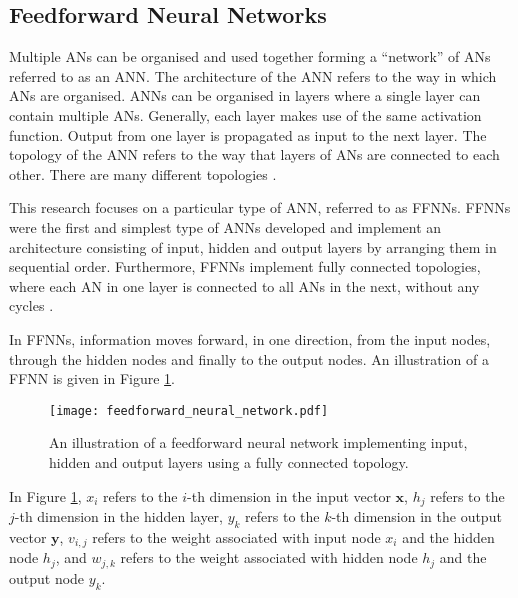 \subsection{Feedforward Neural Networks}
\label{sec:anns:ffnn}

Multiple \acp{AN} can be organised and used together forming a ``network'' of \acp{AN} referred to as an \acf{ANN}. The architecture of the \acs{ANN} refers to the way in which \acp{AN} are organised. \acp{ANN} can be organised in layers where a single layer can contain multiple \acp{AN}. Generally, each layer makes use of the same activation function. Output from one layer is propagated as input to the next layer. The topology of the \acs{ANN} refers to the way that layers of \acp{AN} are connected to each other. There are many different topologies  \cite{ref:miikkulainen:2010}.

This research focuses on a particular type of \acs{ANN}, referred to as \acp{FFNN}. \acp{FFNN} were the first and simplest type of \acp{ANN} developed  \cite{ref:schmidhuber:2015} and implement an architecture consisting of input, hidden and output layers by arranging them in sequential order. Furthermore, \acp{FFNN} implement fully connected topologies, where each \acs{AN} in one layer is connected to all \acp{AN} in the next, without any cycles  \cite{ref:zell:1994}.

In \acp{FFNN}, information moves forward, in one direction, from the input nodes, through the hidden nodes and finally to the output nodes. An illustration of a \acs{FFNN} is given in Figure  \ref{fig:ffnn}.

\begin{figure}[htb]
	\centering
	\texttt{[image: feedforward\_neural\_network.pdf]}
	\caption[A feedforward neural network]{An illustration of a feedforward neural network implementing input, hidden and output layers using a fully connected topology.}
	\label{fig:ffnn}
\end{figure}

In Figure  \ref{fig:ffnn}, $x_i$ refers to the $i$-th dimension in the input vector $\boldsymbol{x}$, $h_j$ refers to the $j$-th dimension in the hidden layer, $y_k$ refers to the $k$-th dimension in the output vector $\boldsymbol{y}$, $v_{i,j}$ refers to the weight associated with input node $x_i$ and the hidden node $h_j$, and $w_{j,k}$ refers to the weight associated with hidden node $h_j$ and the output node $y_k$.


